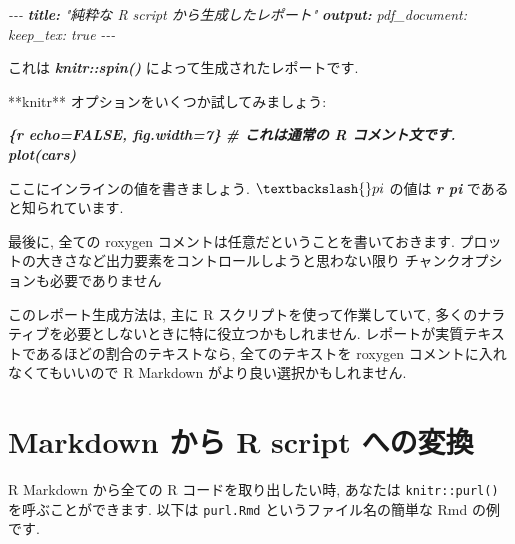 \documentclass[
  11pt,
]{bxjsreport}
\newenvironment{Shaded}{\begin{snugshade}}{\end{snugshade}}
\newcommand{\AnnotationTok}[1]{\textcolor[rgb]{0.56,0.35,0.01}{\textbf{\textit{#1}}}}
\newcommand{\CommentTok}[1]{\textcolor[rgb]{0.56,0.35,0.01}{\textit{#1}}}
\newcommand{\InformationTok}[1]{\textcolor[rgb]{0.56,0.35,0.01}{\textbf{\textit{#1}}}}
\newcommand{\NormalTok}[1]{#1}
\begin{document}
\begin{Shaded}
\begin{Highlighting}[]
\CommentTok{{-}{-}{-}}
\AnnotationTok{title:}\CommentTok{ "純粋な R script から生成したレポート"}
\AnnotationTok{output:}
\CommentTok{  pdf\_document:}
\CommentTok{    keep\_tex: true}
\CommentTok{{-}{-}{-}}

\NormalTok{これは }\InformationTok{\textasciigrave{}knitr::spin()\textasciigrave{}}\NormalTok{ によって生成されたレポートです.}

\NormalTok{**knitr** オプションをいくつか試してみましょう:}

\InformationTok{\textasciigrave{}\textasciigrave{}\textasciigrave{}\{r echo=FALSE, fig.width=7\}}
\InformationTok{\#  これは通常の R コメント文です.}
\InformationTok{plot(cars)}
\InformationTok{\textasciigrave{}\textasciigrave{}\textasciigrave{}}

\NormalTok{ここにインラインの値を書きましょう. $\textbackslash{}pi$ の値は}
\InformationTok{\textasciigrave{}\textasciigrave{}r  pi  \textasciigrave{}\textasciigrave{}}
\NormalTok{であると知られています.}

\NormalTok{最後に, 全ての roxygen コメントは任意だということを書いておきます.}
\NormalTok{プロットの大きさなど出力要素をコントロールしようと思わない限り}
\NormalTok{チャンクオプションも必要でありません}
\end{Highlighting}
\end{Shaded}

このレポート生成方法は, 主に R スクリプトを使って作業していて, 多くのナラティブを必要としないときに特に役立つかもしれません. レポートが実質テキストであるほどの割合のテキストなら, 全てのテキストを roxygen コメントに入れなくてもいいので R Markdown がより良い選択かもしれません.

\hypertarget{purl}{%
\section{Markdown から R script への変換}\label{purl}}

R Markdown から全ての R コードを取り出したい時, あなたは \texttt{knitr::purl()} を呼ぶことができます. 以下は \texttt{purl.Rmd} というファイル名の簡単な Rmd の例です.
\end{document}
